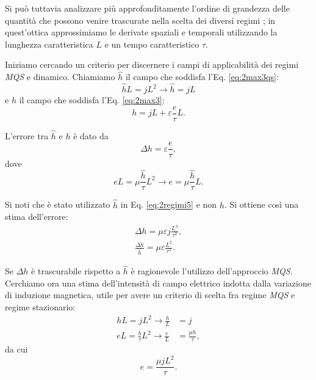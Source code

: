 Si può tuttavia analizzare più approfonditamente l'ordine di grandezza delle quantità che possono venire trascurate nella scelta dei diversi regimi \citep{emson_methods_1988}; in quest'ottica approssimiamo le derivate spaziali e temporali utilizzando la lunghezza caratteristica $L$ e un tempo caratteristico $\tau$. 

Iniziamo cercando un criterio per discernere i campi di applicabilità dei regimi \textit{MQS} e dinamico. Chiamiamo $\hat{h}$ il campo che soddisfa l'Eq. \eqref{eq:2max3qs}:
\begin{equation}
\label{eq:2regimi2}
\hat{h} L = j L^2 \longrightarrow \hat{h} =  j L
\end{equation}   
e $h$ il campo che soddisfa l'Eq. \eqref{eq:2max3}:
\begin{equation}
\label{eq:2regimi3}
h =  j L +  \varepsilon \frac{e}{\tau} L.
\end{equation}

L'errore tra $\hat{h}$ e $h$ è dato da
\begin{equation}
\label{eq:2regimi4}
\Delta h =  \varepsilon \frac{e}{\tau},
\end{equation}
dove
\begin{equation}
\label{eq:2regimi5}
e L = \mu \frac{\hat{h}}{\tau} L^2 \longrightarrow e = \mu \frac{\hat{h}}{\tau} L.
\end{equation}

Si noti che è stato utilizzato $\hat{h}$ in Eq. \eqref{eq:2regimi5} e non $h$. Si ottiene così una stima dell'errore:
\begin{align}
\label{eq:2regime6_a}
\Delta h = \mu \varepsilon j \frac{L^3}{\tau^2}, \\
\label{eq:2regime6_b}
\frac{\Delta h}{\hat{h}} = \mu \varepsilon \frac{L^2}{\tau^2}.
\end{align}

Se $\Delta h$ è trascurabile rispetto a $\hat{h}$ è ragionevole l'utilizzo dell'approccio \textit{MQS}.\\

Cerchiamo ora una stima dell'intensità di campo elettrico indotta dalla variazione di induzione magnetica, utile per avere un criterio di scelta fra regime \textit{MQS} e regime stazionario:
\begin{align}
\label{eq:2regimi7_a}
hL= jL^2 \longrightarrow \frac{h}{L} &= j\\
\label{eq:2regimi7_b}
eL= \frac{b}{\tau} L^2 \longrightarrow\frac{e}{L} &= \frac{\mu h}{\tau},
\end{align} 
da cui
\begin{equation}
\label{eq:2regimi8}
e = \frac{\mu j L^2}{\tau}.
\end{equation}

